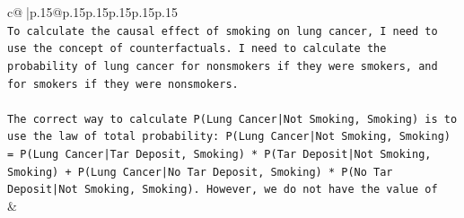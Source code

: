 \documentclass{article}
\begin{document}
{\begin{supertabular}{c@{$\;$}|p{.15\linewidth}@{}p{.15\linewidth}p{.15\linewidth}p{.15\linewidth}p{.15\linewidth}p{.15\linewidth}}
{{{\\ 
\texttt{To calculate the causal effect of smoking on lung cancer, I need to use the concept of counterfactuals. I need to calculate the probability of lung cancer for nonsmokers if they were smokers, and for smokers if they were nonsmokers. } \\
\\ 
\texttt{The correct way to calculate P(Lung Cancer|Not Smoking, Smoking) is to use the law of total probability: P(Lung Cancer|Not Smoking, Smoking) = P(Lung Cancer|Tar Deposit, Smoking) * P(Tar Deposit|Not Smoking, Smoking) + P(Lung Cancer|No Tar Deposit, Smoking) * P(No Tar Deposit|Not Smoking, Smoking). However, we do not have the value of} \\
            }
        }
    }
    & \\ \\

\end{supertabular}
}
\end{document}
